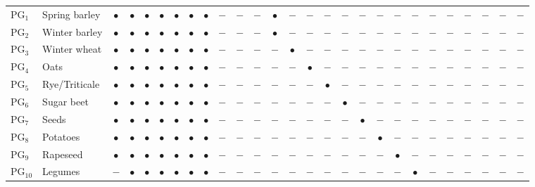 \documentclass[12pt]{article}
\begin{document}
\begin{table}[htbp]
\begin{threeparttable}
{\begin{tabular}{llccccccccccccccccccccccccc}
PG$_1$      & Spring barley        & $\bullet$ & $\bullet$ & $\bullet$ & $\bullet$ & $\bullet$ & $\bullet$ & $\bullet$ & $-$ & $-$ & $-$ & $\bullet$ & $-$ & $-$ & $-$ & $-$ & $-$ & $-$ & $-$ & $-$ & $-$ & $-$ & $-$ & $-$ & $-$ & $-$ \\
PG$_2$      & Winter barley        & $\bullet$ & $\bullet$ & $\bullet$ & $\bullet$ & $\bullet$ & $\bullet$ & $\bullet$ & $-$ & $-$ & $-$ & $\bullet$ & $-$ & $-$ & $-$ & $-$ & $-$ & $-$ & $-$ & $-$ & $-$ & $-$ & $-$ & $-$ & $-$ & $-$ \\
PG$_3$      & Winter wheat         & $\bullet$ & $\bullet$ & $\bullet$ & $\bullet$ & $\bullet$ & $\bullet$ & $\bullet$ & $-$ & $-$ & $-$ & $-$ & $\bullet$ & $-$ & $-$ & $-$ & $-$ & $-$ & $-$ & $-$ & $-$ & $-$ & $-$ & $-$ & $-$ & $-$ \\
PG$_4$      & Oats                 & $\bullet$ & $\bullet$ & $\bullet$ & $\bullet$ & $\bullet$ & $\bullet$ & $\bullet$ & $-$ & $-$ & $-$ & $-$ & $-$ & $\bullet$ & $-$ & $-$ & $-$ & $-$ & $-$ & $-$ & $-$ & $-$ & $-$ & $-$ & $-$ & $-$ \\
PG$_5$      & Rye/Triticale        & $\bullet$ & $\bullet$ & $\bullet$ & $\bullet$ & $\bullet$ & $\bullet$ & $\bullet$ & $-$ & $-$ & $-$ & $-$ & $-$ & $-$ & $\bullet$ & $-$ & $-$ & $-$ & $-$ & $-$ & $-$ & $-$ & $-$ & $-$ & $-$ & $-$ \\
PG$_6$      & Sugar beet           & $\bullet$ & $\bullet$ & $\bullet$ & $\bullet$ & $\bullet$ & $\bullet$ & $\bullet$ & $-$ & $-$ & $-$ & $-$ & $-$ & $-$ & $-$ & $\bullet$ & $-$ & $-$ & $-$ & $-$ & $-$ & $-$ & $-$ & $-$ & $-$ & $-$ \\
PG$_7$      & Seeds                & $\bullet$ & $\bullet$ & $\bullet$ & $\bullet$ & $\bullet$ & $\bullet$ & $\bullet$ & $-$ & $-$ & $-$ & $-$ & $-$ & $-$ & $-$ & $-$ & $\bullet$ & $-$ & $-$ & $-$ & $-$ & $-$ & $-$ & $-$ & $-$ & $-$ \\
PG$_8$      & Potatoes             & $\bullet$ & $\bullet$ & $\bullet$ & $\bullet$ & $\bullet$ & $\bullet$ & $\bullet$ & $-$ & $-$ & $-$ & $-$ & $-$ & $-$ & $-$ & $-$ & $-$ & $\bullet$ & $-$ & $-$ & $-$ & $-$ & $-$ & $-$ & $-$ & $-$ \\
PG$_9$      & Rapeseed             & $\bullet$ & $\bullet$ & $\bullet$ & $\bullet$ & $\bullet$ & $\bullet$ & $\bullet$ & $-$ & $-$ & $-$ & $-$ & $-$ & $-$ & $-$ & $-$ & $-$ & $-$ & $\bullet$ & $-$ & $-$ & $-$ & $-$ & $-$ & $-$ & $-$ \\
PG$_{10}$   & Legumes              & $-$ & $\bullet$ & $\bullet$ & $\bullet$ & $\bullet$ & $\bullet$ & $\bullet$ & $-$ & $-$ & $-$ & $-$ & $-$ & $-$ & $-$ & $-$ & $-$ & $-$ & $-$ & $\bullet$ & $-$ & $-$ & $-$ & $-$ & $-$ & $-$ \\

\end{tabular}}
\end{threeparttable}
\end{table}
\end{document}
